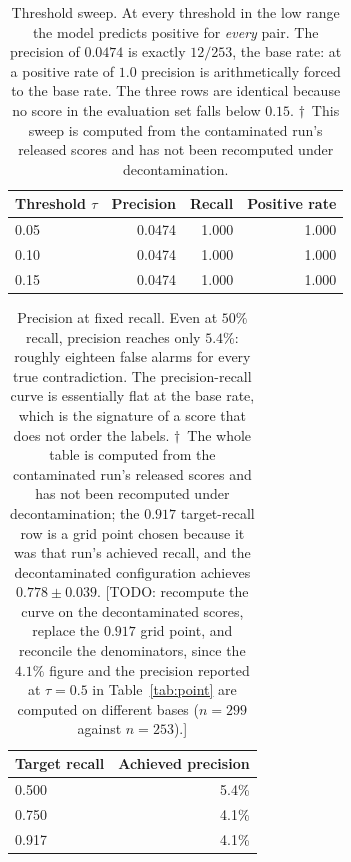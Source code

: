 \begin{table}[t]
\centering
\small
\begin{tabular}{lrrr}
\toprule
\textbf{Threshold $\tau$} & \textbf{Precision} & \textbf{Recall} & \textbf{Positive rate} \\
\midrule
0.05 & 0.0474 & 1.000 & 1.000 \\
0.10 & 0.0474 & 1.000 & 1.000 \\
0.15 & 0.0474 & 1.000 & 1.000 \\
\bottomrule
\end{tabular}
\caption{Threshold sweep. At every threshold in the low range the model predicts
positive for \emph{every} pair. The precision of $0.0474$ is exactly $12/253$,
the base rate: at a positive rate of $1.0$ precision is arithmetically forced to
the base rate. The three rows are identical because no score in the evaluation
set falls below $0.15$. $\dagger$~This sweep is computed from the contaminated
run's released scores and has not been recomputed under decontamination.}
\label{tab:sweep}
\end{table}

\begin{table}[t]
\centering
\small
\begin{tabular}{lr}
\toprule
\textbf{Target recall} & \textbf{Achieved precision} \\
\midrule
0.500 & 5.4\% \\
0.750 & 4.1\% \\
0.917 & 4.1\% \\
\bottomrule
\end{tabular}
\caption{Precision at fixed recall. Even at $50\%$ recall, precision reaches
only $5.4\%$: roughly eighteen false alarms for every true contradiction. The
precision-recall curve is essentially flat at the base rate, which is the
signature of a score that does not order the labels. $\dagger$~The whole table is
computed from the contaminated run's released scores and has not been recomputed
under decontamination; the $0.917$ target-recall row is a grid point chosen
because it was that run's achieved recall, and the decontaminated configuration
achieves $0.778 \pm 0.039$. [TODO: recompute the curve on the decontaminated
scores, replace the $0.917$ grid point, and reconcile the denominators, since the
$4.1\%$ figure and the precision reported at $\tau = 0.5$ in
Table~\ref{tab:point} are computed on different bases ($n = 299$ against
$n = 253$).]}
\label{tab:pr}
\end{table}

